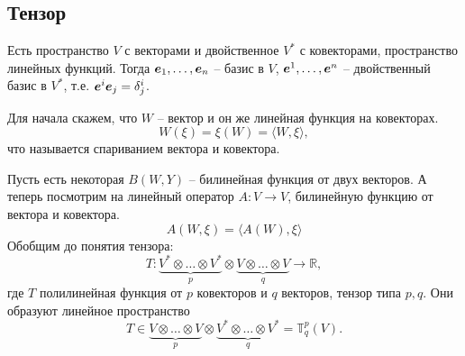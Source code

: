 \subsection{Тензор}

Есть пространство $V$ с векторами и двойственное $V^*$ с ковекторами, пространство линейных функций.
Тогда $\mbox{\boldmath $e$}_1, \ldots, \mbox{\boldmath $e$}_n$ -- базис в $V$, $\mbox{\boldmath $e$}^1, \ldots, \mbox{\boldmath $e$}^n$ -- двойственный базис в $V^*$, т.е. $\mbox{\boldmath $e$}^i \mbox{\boldmath $e$}_j = \delta^i_j$. 

Для начала скажем, что $W$ -- вектор и он же линейная функция на ковекторах. 
$$
    W(\xi) = \xi(W) = \langle W, \xi \rangle,
$$
что называется спариванием вектора и ковектора.

Пусть есть некоторая $B(W, Y)$ -- билинейная функция от двух векторов. А теперь посмотрим на линейный оператор $A \colon V \to V$, билинейную функцию от вектора и ковектора.
$$
    A(W, \xi) = \langle A(W), \xi \rangle
$$
Обобщим до понятия тензора:
$$
    T \colon 
    \underbrace{V^* \otimes \ldots \otimes V^* }_{p}
    \otimes 
    \underbrace{V \otimes \ldots \otimes V }_{q}
    \to \mathbb{R},
$$
где $T$ полилинейная функция от $p$ ковекторов и $q$ векторов, тензор типа $p, q$. Они образуют линейное пространство
$$
    T \in     
    \underbrace{V \otimes \ldots \otimes V}_{p}
    \otimes 
    \underbrace{V^* \otimes \ldots \otimes V^*}_{q} = \mathbb{T}^p_q (V).
$$
